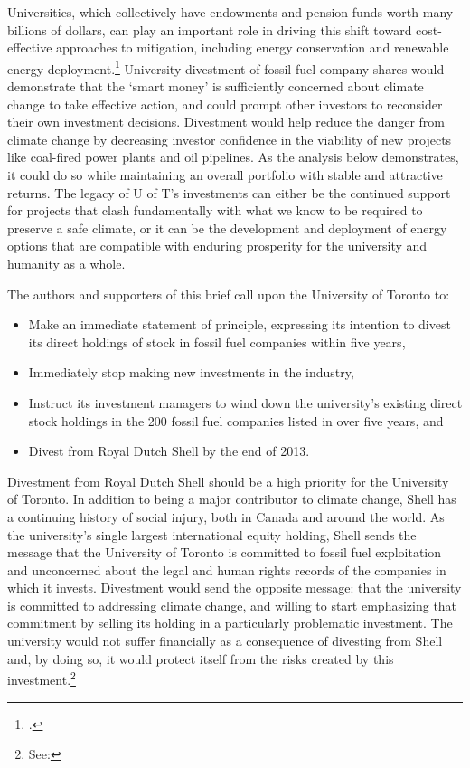 Universities, which collectively have endowments and pension funds worth many billions of dollars, can play an important role in driving this shift toward cost-effective approaches to  mitigation, including energy conservation and renewable energy deployment.\footcite[The consultancy McKinsey \& Company has studied and ranked global options for mitigating GHG pollution, considering their cost, plausible deployment speed, and the scale at which they can help solve the problem. See: ][p. 8]{McKinseyCurve}
University divestment of fossil fuel company shares would demonstrate that the `smart money' is sufficiently concerned about climate change to take effective action, and could prompt other investors to reconsider their own investment decisions. 
Divestment would help reduce the danger from climate change by decreasing investor confidence in the viability of new projects like coal-fired power plants and oil pipelines.
As the analysis below demonstrates, it could do so while maintaining an overall portfolio with stable and attractive returns.
The legacy of U of T's investments can either be the continued support for projects that clash fundamentally with what we know to be required to preserve a safe climate, or it can be the development and deployment of energy options that are compatible with enduring prosperity for the university and humanity as a whole.



The authors and supporters of this brief call upon the University of Toronto to:
\begin{itemize}
	\item Make an immediate statement of principle, expressing its intention to divest its direct holdings of stock in fossil fuel companies within five years,
	\item Immediately stop making new investments in the industry,
	\item Instruct its investment managers to wind down the university's existing direct stock holdings in the 200 fossil fuel companies listed in  over five years, and
	\item Divest from Royal Dutch Shell by the end of 2013.
\end{itemize}



Divestment from Royal Dutch Shell should be a high priority for the University of Toronto. 
In addition to being a major contributor to climate change, Shell has a continuing history of social injury, both in Canada and around the world. 
As the university's single largest international equity holding, Shell sends the message that the University of Toronto is committed to fossil fuel exploitation and unconcerned about the legal and human rights records of the companies in which it invests. 
Divestment would send the opposite message: that the university is committed to addressing climate change, and willing to start emphasizing that commitment by selling its holding in a particularly problematic investment.  
The university would not suffer financially as a consequence of divesting from Shell and, by doing so, it would protect itself from the risks created by this investment.\footnote{See: }



